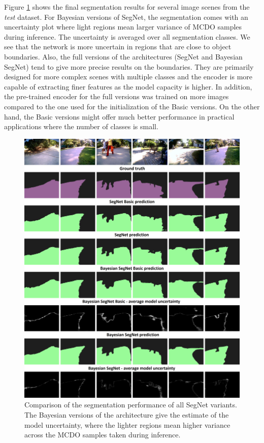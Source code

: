 Figure \ref{comparison} shows the final segmentation results for several image scenes from the \textit{test} dataset. For Bayesian versions of SegNet, the segmentation comes with an uncertainty plot where light regions mean larger variance of MCDO samples during inference. The uncertainty is averaged over all segmentation classes. We see that the network is more uncertain in regions that are close to object boundaries. Also, the full versions of the architectures (SegNet and Bayesian SegNet) tend to give more precise results on the boundaries. They are primarily designed for more complex scenes with multiple classes and the encoder is more capable of extracting finer features as the model capacity is higher. In addition, the pre-trained encoder for the full versions was trained on more images compared to the one used for the initialization of the Basic versions. On the other hand, the Basic versions might offer much better performance in practical applications where the number of classes is small.

\begin{figure}[h]
	\begin{center}
		\includegraphics*[width=16cm, keepaspectratio]{obr/result.png}
	\end{center}
	\vspace{5mm}
	\caption{Comparison of the segmentation performance of all SegNet variants. The Bayesian versions of the architecture give the estimate of the model uncertainty, where the lighter regions mean higher variance across the MCDO samples taken during inference.} 
	\label{comparison}
\end{figure}
